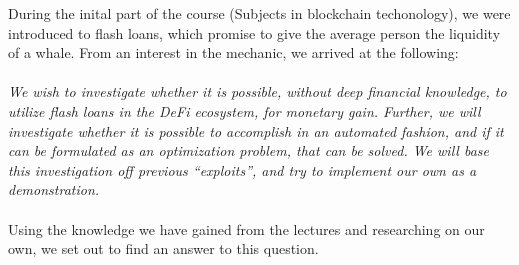 During the inital part of the course (Subjects in blockchain techonology), we
were introduced to flash loans, which promise to give the average person the
liquidity of a whale. From an interest in the mechanic, we arrived at the
following:\\\\
\textit{We wish to investigate whether it is possible, without deep financial
knowledge, to utilize flash loans in the DeFi ecosystem, for monetary
gain. Further, we will investigate whether it is possible to accomplish in
an automated fashion, and if it can be formulated as an optimization
problem, that can be solved. We will base this investigation off previous
``exploits'', and try to implement our own as a demonstration.}\\\\
Using the knowledge we have gained from the lectures and researching on our own,
we set out to find an answer to this question.


